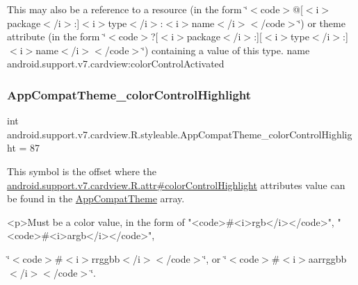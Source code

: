 This may also be a reference to a resource (in the form \char`\"{}$<$code$>$@\mbox{[}$<$i$>$package$<$/i$>$\+:\mbox{]}$<$i$>$type$<$/i$>$\+:$<$i$>$name$<$/i$>$$<$/code$>$\char`\"{}) or theme attribute (in the form \char`\"{}$<$code$>$?\mbox{[}$<$i$>$package$<$/i$>$\+:\mbox{]}\mbox{[}$<$i$>$type$<$/i$>$\+:\mbox{]}$<$i$>$name$<$/i$>$$<$/code$>$\char`\"{}) containing a value of this type.  name android.\+support.\+v7.\+cardview\+:color\+Control\+Activated \mbox{\label{classandroid_1_1support_1_1v7_1_1cardview_1_1R_1_1styleable_a49a7aa79b96c0ee6b0ea6d734fb2c0c2}} 
\subsubsection{\texorpdfstring{App\+Compat\+Theme\+\_\+color\+Control\+Highlight}{AppCompatTheme\_colorControlHighlight}}
{\footnotesize\ttfamily int android.\+support.\+v7.\+cardview.\+R.\+styleable.\+App\+Compat\+Theme\+\_\+color\+Control\+Highlight = 87\hspace{0.3cm}{\ttfamily [static]}}

This symbol is the offset where the \hyperlink{classandroid_1_1support_1_1v7_1_1cardview_1_1R_1_1attr_ac029806242aff5fd87d40c6135ca465d}{android.\+support.\+v7.\+cardview.\+R.\+attr\#color\+Control\+Highlight} attribute\textquotesingle{}s value can be found in the \hyperlink{classandroid_1_1support_1_1v7_1_1cardview_1_1R_1_1styleable_a52e6f69f954ecc2622d72c0b4d298938}{App\+Compat\+Theme} array.

\begin{DoxyVerb}      <p>Must be a color value, in the form of "<code>#<i>rgb</i></code>", "<code>#<i>argb</i></code>",
\end{DoxyVerb}
 \char`\"{}$<$code$>$\#$<$i$>$rrggbb$<$/i$>$$<$/code$>$\char`\"{}, or \char`\"{}$<$code$>$\#$<$i$>$aarrggbb$<$/i$>$$<$/code$>$\char`\"{}. 

